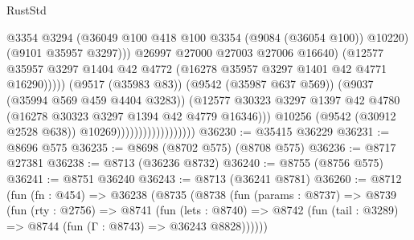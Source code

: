 \begin{lexlean}{RustStd}
\begin{coremodule}
                                                      @3354
                                                      @3294
                                                      (@36049
                                                        @100
                                                        @418
                                                        @100
                                                        @3354
                                                        (@9084 (@36054 @100))
                                                        @10220)
                                                      (@9101 @35957 @3297)))
                                                  @26997
                                                  @27000
                                                  @27003
                                                  @27006
                                                  @16640)
                                                (@12577
                                                  @35957
                                                  @3297
                                                  @1404
                                                  @42
                                                  @4772
                                                  (@16278 @35957 @3297 @1401 @42 @4771 @16290)))))
                                          (@9517 (@35983 @83))
                                          (@9542 (@35987 @637 @569))
                                          (@9037 (@35994 @569 @459 @4404 @3283))
                                          (@12577
                                            @30323
                                            @3297
                                            @1397
                                            @42
                                            @4780
                                            (@16278 @30323 @3297 @1394 @42 @4779 @16346)))
                                        @10256
                                        (@9542 (@30912 @2528 @638))
                                        @10269))))))))))))))))))
@36230 := @35415 @36229
@36231 := @8696 @575
@36235 := @8698 (@8702 @575) (@8708 @575)
@36236 := @8717 @27381
@36238 := @8713 (@36236 @8732)
@36240 := @8755 (@8756 @575)
@36241 := @8751 @36240
@36243 := @8713 (@36241 @8781)
@36260 := @8712
    (fun (fn : @454) =>
    @36238
      (@8735
        (@8738
          (fun (params : @8737) =>
          @8739
            (fun (rty : @2756) =>
            @8741
              (fun (lets : @8740) =>
              @8742 (fun (tail : @3289) => @8744 (fun (Γ : @8743) => @36243 @8828))))))

\end{coremodule}
\end{lexlean}
